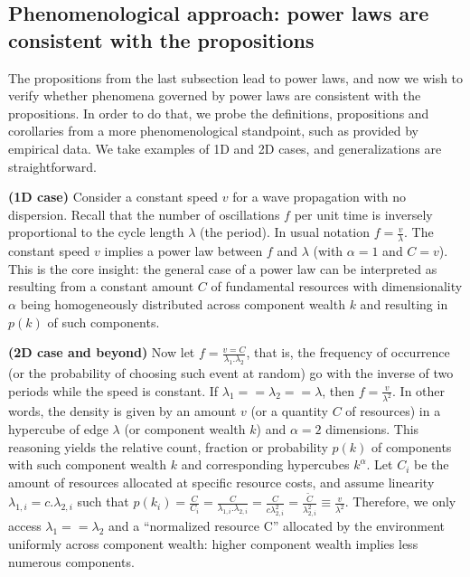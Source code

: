 \documentclass[10pt,letterpaper]{article}
\begin{document}
\subsection{Phenomenological approach: power laws are consistent with the propositions}\label{sec:phen}

The propositions from the last subsection lead to power laws, and now we wish to verify whether phenomena governed by power laws are consistent with the propositions. In order to do that, we probe the definitions, propositions and corollaries from a more phenomenological standpoint, such as provided by empirical data. We take examples of 1D and 2D cases, and generalizations are straightforward.  


{\bf (1D case)} Consider a constant speed $v$ for a wave propagation with no dispersion.
Recall that the number of oscillations $f$ per unit time is
inversely proportional to the cycle length $\lambda$ (the period).
In usual notation $f=\frac{v}{\lambda}$.
The constant speed $v$ implies a power law between 
$f$ and $\lambda$ (with $\alpha=1$ and $C=v$).
This is the core insight: the general case of a power law can
be interpreted as resulting from a constant amount $C$ of
fundamental resources with dimensionality $\alpha$ 
being homogeneously distributed across
component wealth $k$ and resulting in $p(k)$ of such components.

{\bf (2D case and beyond)} Now let $f=\frac{v=C}{\lambda_1 . \lambda_2}$, that is, the frequency of occurrence
(or the probability of choosing such event at random) go with the inverse of two periods while the speed is constant. 
If $\lambda_1==\lambda_2==\lambda$, then $f=\frac{v}{\lambda^2}$.
In other words, the density is given by an amount $v$
(or a quantity $C$ of resources) in a hypercube of
edge $\lambda$ (or component wealth $k$)
and $\alpha=2$ dimensions.
This reasoning yields the relative count, fraction or probability $p(k)$ of components with such component wealth $k$ and corresponding hypercubes $k^\alpha$.
Let $C_i$ be the amount of resources allocated at
specific resource costs,
and assume linearity $\lambda_{1,i}=c.\lambda_{2,i}$
such that
$p(k_i)=\frac{C}{C_i}=\frac{C}{\lambda_{1,i}.\lambda_{2,i}}=
\frac{C}{c\lambda_{2,i}^2}=\frac{\widetilde{C}}{\lambda_{2,i}^2}\equiv\frac{v}{\lambda^2}$.
Therefore, we only access $\lambda_1==\lambda_2$ and a ``normalized resource C'' allocated by the environment uniformly across component wealth: higher component wealth implies less numerous components. 
\end{document}
